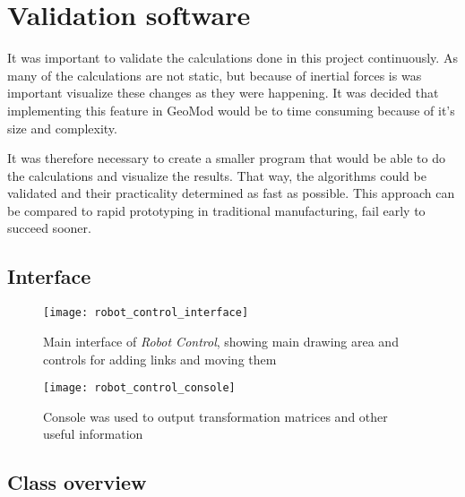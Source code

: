 \chapter{Validation software}

It was important to validate the calculations done in this project continuously. As many of the calculations are not static, but because of inertial forces is was important visualize these changes as they were happening. It was decided that implementing this feature in GeoMod would be to time consuming because of it's size and complexity. 

It was therefore necessary to create a smaller program that would be able to do the calculations and visualize the results. That way, the algorithms could be validated and their practicality determined as fast as possible. This approach can be compared to rapid prototyping in traditional manufacturing, fail early to succeed sooner.


\section{Interface}


\begin{figure}[h!]
    \centering
    \texttt{[image: robot\_control\_interface]}
    \caption{Main interface of \textit{Robot Control}, showing main drawing area and controls for adding links and moving them}
    \label{interface}
\end{figure}

\begin{figure}[h!]
    \centering
    \texttt{[image: robot\_control\_console]}
    \caption{Console was used to output transformation matrices and other useful information}
    \label{console}
\end{figure}

\section{Class overview}


